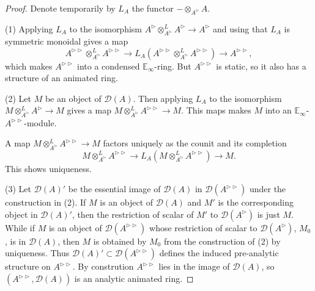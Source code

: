 \documentclass{article}
\theoremstyle{plain}
\theoremstyle{definition}
\theoremstyle{remark}
\newcommand{\dten}{\otimes ^{L}}
\newcommand{\huflag}{\triangleright}
\newcommand{\D}{\mathcal{D}}
\begin{document}
\begin{proof}
Denote temporarily by $ L _{A} $ the functor $ -\otimes _{A ^{\huflag}} A $.

(1)
Applying $ L _{A} $ to the isomorphism $ A ^{\huflag}\dten _{A ^{\huflag}} A ^{\huflag} \to A ^{\huflag} $
and using that $ L _{A} $ is symmetric monoidal gives a map 
$$ A ^{\huflag\huflag}\dten _{A ^{\huflag}} A ^{\huflag\huflag}\to L _{A} (A ^{\huflag\huflag} \dten _{A ^{\huflag}} A ^{\huflag\huflag})
\to A ^{\huflag\huflag}, $$
which makes $ A ^{\huflag\huflag} $ into a condensed $ \mathbb{E}_{\infty} $-ring.
But $ A ^{\huflag\huflag} $ is static, so it also has a structure of an animated ring.

(2)
Let $ M $ be an object of $ \D (A) $. Then applying $ L _{A} $ to the isomorphism $ M\dten _{A ^{\huflag}} A ^{\huflag}\to M $ gives a map
$ M \dten _{A ^{\huflag}} A ^{\huflag\huflag}\to M $.
This maps makes $ M $ into an $ \mathbb{E}_{\infty} $-$ A ^{\huflag\huflag} $-module.

A map $ M\dten _{A ^{\huflag}} A ^{\huflag\huflag} \to M $ factors uniquely as the counit and its completion
$$M \dten _{A ^{\huflag}}A ^{\huflag\huflag}\to L _{A}(M \dten _{A ^{\huflag}} A ^{\huflag\huflag}) \to M .$$
This shows uniqueness.

(3)
Let $ \D (A)' $ be the essential image of $ \D (A) $ in $ \D (A ^{\huflag\huflag}) $ under the construction in (2).
If $ M $ is an object of $ \D (A) $ and $ M' $ is the corresponding object in $ \D (A)' $,
then the restriction of scalar of $ M' $ to $ \D (A ^{\huflag}) $ is just $ M $.
While if $ M $ is an object of $ \D (A ^{\huflag\huflag}) $ whose restriction of scalar to $ \D (A ^{\huflag}) $, $ M _{0} $,
is in $ \D (A) $, then $ M $ is obtained by $ M _{0} $ from the construction of (2) by uniqueness.
Thus $ \D (A)' \subset \D (A ^{\huflag\huflag}) $ defines the induced pre-analytic structure on $ A ^{\huflag\huflag} $.
By constrution $ A ^{\huflag\huflag} $ lies in the image of $ \D (A) $,
so $ (A ^{\huflag\huflag}, \D (A)) $ is an analytic animated ring.


\end{proof}
\end{document}
